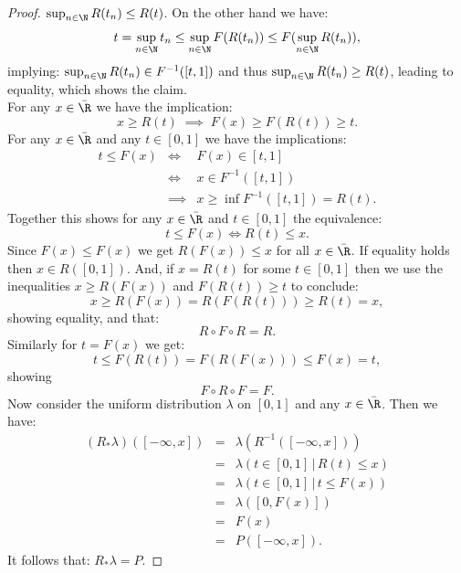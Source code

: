 \begin{Lem}
\begin{proof}
    $\sup_{n\in\N}R(t_n) \le R(t)$. On the other hand we have:
\[ t = \sup_{n \in\N} t_n \le \sup_{n\in\N} F(R(t_n)) \le F( \sup_{n\in\N} R(t_n)), \]
implying: $\sup_{n\in\N}R(t_n) \in F^{-1}([t,1])$ and thus $\sup_{n\in\N}R(t_n)\ge R(t)$, leading to equality, which shows the claim.\\
    For any  $x \in \bar\R$  we have the implication:
    \[x \ge R(t) \;\implies\; F(x) \ge F(R(t)) \ge t.\]
    For any $x \in \bar \R$ and any $t \in [0,1]$ we have the implications:
\[ \begin{array}{llll}
t \le F(x) &\iff& F(x) \in [t,1] \\
 &\iff& x \in F^{-1}([t,1]) \\
&\implies& x \ge \inf F^{-1}([t,1]) = R(t). %
\end{array}\]
Together this shows for any $x \in \bar \R$ and $t \in [0,1]$ the equivalence:
\[ t \le F(x) \iff R(t) \le x.  \] 
Since $F(x) \le F(x)$ we get $R(F(x)) \le x$ for all $x \in \bar\R$. %
If equality holds then $x \in R([0,1])$. And, if $x =R(t)$ for some $t \in [0,1]$ then we use the inequalities $x \ge R(F(x))$ and $F(R(t))\ge t$ to conclude:
\[ x \ge R(F(x)) = R ( F(R(t))) \ge R(t)=x,\]
showing equality, and that:
\[ R \circ F \circ R = R.\]
Similarly for $t=F(x)$ we get:
\[ t \le F(R(t)) = F ( R(F(x))) \le F(x)=t,\]
showing 
\[ F \circ R \circ F = F.\]
Now consider the uniform distribution $\lambda$ on $[0,1]$ and any $x \in \bar\R$.
Then we have:
\[ \begin{array}{llll}
    (R_*\lambda)([-\infty,x]) &=& \lambda(R^{-1}([-\infty,x])) \\
 &=&  \lambda(t \in [0,1] \,|\,  R(t) \le x) \\
 &=&  \lambda(t \in [0,1]\, |\, t \le F(x)) \\
&=&  \lambda([0, F(x)])\\
 &=& F(x)\\
&=& P([-\infty,x]).
\end{array}\]
It follows that: $R_*\lambda = P$.%
\end{proof}
\end{Lem}



